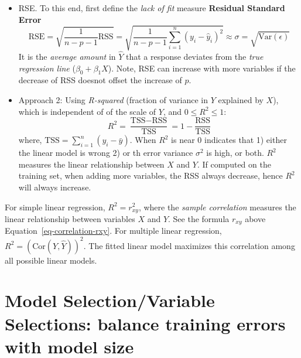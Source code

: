 \documentclass[
  letterpaper,
  DIV=11,
  numbers=noendperiod]{scrreprt}
\begin{document}
\begin{itemize}
\item
  RSE. To this end, first define the \emph{lack of fit} measure
  \textbf{Residual Standard Error} \[
  \text{RSE} = \sqrt{\frac{1}{n-p-1}\text{RSS}} = \sqrt{\frac{1}{n-p-1}\sum_{i=1}^n(y_i-\hat{y}_i)^2} \approx \sigma=\sqrt{\text{Var}(\epsilon)}
  \] It is the \emph{average amount} in \(\hat{Y}\) that a response
  deviates from the \emph{true regression line} (\(\beta_0+\beta_1 X\)).
  Note, RSE can increase with more variables if the decrease of RSS
  doesnot offset the increase of \(p\).
\item
  Approach 2: Using \emph{R-squared} (fraction of variance in \(Y\)
  explained by \(X\)), which is independent of of the scale of \(Y\),
  and \(0\le R^2 \le 1\): \[
  R^2 =\frac{\text{TSS}-\text{RSS}}{\text{TSS}} = 1-\frac{\text{RSS}}{\text{TSS}}
  \] where, \(\text{TSS}=\sum_{i=1}^n(y_i- \bar{y})\). When \(R^2\) is
  near 0 indicates that 1) either the linear model is wrong 2) or th
  error variance \(\sigma^2\) is high, or both. \(R^2\) measures the
  linear relationship between \(X\) and \(Y\). If computed on the
  training set, when adding more variables, the RSS always decrease,
  hence \(R^2\) will always increase.
\end{itemize}

For simple linear regression, \(R^2=r_{xy}^2\), where the \emph{sample
correlation} measures the linear relationship between variables \(X\)
and \(Y\). See the formula \(r_{xy}\) above
Equation~\ref{eq-correlation-rxy}. For multiple linear regression,
\(R^2=(\text{Cor}(Y, \hat{Y}))^2\). The fitted linear model maximizes
this correlation among all possible linear models.

\section{Model Selection/Variable Selections: balance training errors
with model
size}\label{model-selectionvariable-selections-balance-training-errors-with-model-size}
\end{document}
